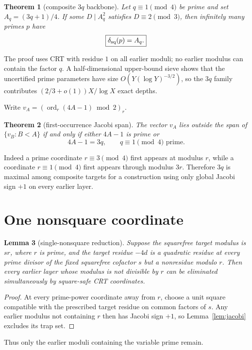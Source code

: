 \documentclass[11pt]{article}
\newtheorem{theorem}{Theorem}
\newtheorem{lemma}[theorem]{Lemma}
\theoremstyle{definition}
\newcommand{\sqdepth}{\delta_{\rm sq}}
\begin{document}
\begin{theorem}[composite $3q$ backbone]\label{thm:3q}
Let $q\equiv1\pmod4$ be prime and set $A_q=(3q+1)/4$. If some $D\mid A_q^2$ satisfies $D\equiv2\pmod3$, then infinitely many primes $p$ have
\[
\boxed{\sqdepth(p)=A_q.}
\]
\end{theorem}

The proof uses CRT with residue $1$ on all earlier moduli; no earlier modulus can contain the factor $q$. A half-dimensional upper-bound sieve shows that the uncertified prime parameters have size $O(Y(\log Y)^{-3/2})$, so the $3q$ family contributes $(2/3+o(1))X/\log X$ exact depths.

Write $v_A=(\operatorname{ord}_r(4A-1)\bmod2)_r$.

\begin{theorem}[first-occurrence Jacobi span]\label{thm:span}
The vector $v_A$ lies outside the span of $\{v_B:B<A\}$ if and only if either $4A-1$ is prime or
\[
4A-1=3q,
\qquad q\equiv1\pmod4\text{ prime}.
\]
\end{theorem}

Indeed a prime coordinate $r\equiv3\pmod4$ first appears at modulus $r$, while a coordinate $r\equiv1\pmod4$ first appears through modulus $3r$. Therefore $3q$ is maximal among composite targets for a construction using only global Jacobi sign $+1$ on every earlier layer.

\section{One nonsquare coordinate}
\begin{lemma}[single-nonsquare reduction]\label{lem:single}
Suppose the squarefree target modulus is $sr$, where $r$ is prime, and the target residue $-4d$ is a quadratic residue at every prime divisor of the fixed squarefree cofactor $s$ but a nonresidue modulo $r$. Then every earlier layer whose modulus is not divisible by $r$ can be eliminated simultaneously by square-safe CRT coordinates.
\end{lemma}

\begin{proof}
At every prime-power coordinate away from $r$, choose a unit square compatible with the prescribed target residue on common factors of $s$. Any earlier modulus not containing $r$ then has Jacobi sign $+1$, so Lemma~\ref{lem:jacobi} excludes its trap set.
\end{proof}

Thus only the earlier moduli containing the variable prime remain.
\end{document}

